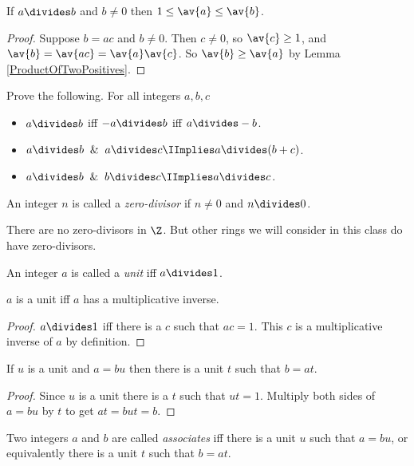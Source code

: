 \documentclass[oneside,12pt]{amsart}
\begin{document}
\begin{lemma}
If $a\divides b$ and $b\not=0$ then $1 \leq \av{a} \leq \av{b}$.
\end{lemma}
\begin{proof}
Suppose $b=ac$ and $b\not=0$. Then $c\not=0$, so $\av{c}\geq 1$, and
$\av{b} = \av{ac} = \av{a}\av{c}$. So $\av{b} \geq \av{a}$ by Lemma
\ref{ProductOfTwoPositives}.
\end{proof}

\begin{homework}
Prove the following. For all integers $a,b,c$
\begin{itemize}
\item $a\divides b$ iff $-a\divides b$ iff $a\divides -b$.
\item $a\divides b \And a\divides c \IImplies a\divides (b+c)$.
\item $a\divides b \And b\divides c \IImplies  a\divides c$.
\end{itemize}
\end{homework}

\begin{definition}
An integer $n$ is called a \emph{zero-divisor} if $n\not=0$ and $n\divides 0$.
\end{definition}

There are no zero-divisors in $\Z$. But other rings we will consider in this
class do have zero-divisors.

\begin{definition}
An integer $a$ is called a \emph{unit} iff $a\divides 1$.
\end{definition}

\begin{lemma}
$a$ is a unit iff $a$ has a multiplicative inverse.
\end{lemma}
\begin{proof}
$a\divides 1$ iff there is a $c$ such that $ac=1$. This $c$ is a multiplicative
inverse of $a$ by definition.
\end{proof}

\begin{lemma}
If $u$ is a unit and $a=bu$ then there is a unit $t$ such that $b=at$.
\end{lemma}
\begin{proof}
Since $u$ is a unit there is a $t$ such that $ut=1$. Multiply both sides
of $a=bu$ by $t$ to get $at=but=b$.
\end{proof}

\begin{definition}
Two integers $a$ and $b$ are called \emph{associates} iff there
is a unit $u$ such that $a=bu$, or equivalently there is a unit $t$ such
that $b=at$.
\end{definition}
\end{document}
